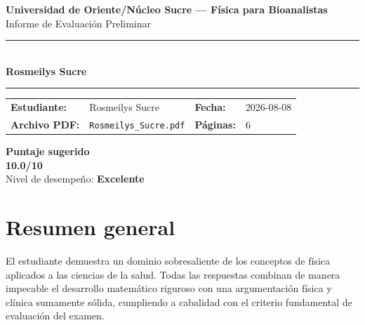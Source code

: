 \documentclass[11pt,a4paper]{article}
\begin{document}
\begin{center}
  {\Large\bfseries\color{azulTitulo} Universidad de Oriente/Núcleo Sucre --- Física para Bioanalistas}\\[4pt]
  {\large Informe de Evaluación Preliminar}\\[12pt]
  \rule{\linewidth}{1.2pt}\\[6pt]
  {\LARGE\bfseries Rosmeilys Sucre}\\[4pt]
  \rule{\linewidth}{0.6pt}
\end{center}

\vspace{4pt}
\begin{tcolorbox}[cajaTitulo, title=Datos del informe]
\begin{tabular}{@{}llll@{}}
  \textbf{Estudiante:}  & Rosmeilys Sucre  &
  \textbf{Fecha:}       & 2026-08-08 \\[4pt]
  \textbf{Archivo PDF:} & \texttt{Rosmeilys\_Sucre.pdf}  &
  \textbf{Páginas:}     & 6 \\
\end{tabular}
\end{tcolorbox}

\vspace{6pt}
\begin{center}
  \begin{tcolorbox}[
    enhanced,
    colback=white, colframe=desempeno_excelente,
    width=0.62\linewidth,
    boxrule=2pt,
    halign=center, valign=center,
    top=8pt, bottom=8pt,
  ]
    \centering
    {\large\bfseries Puntaje sugerido}\\[6pt]
    {\Huge\bfseries\color{desempeno_excelente} 10.0/10}\\[6pt]
    {\large Nivel de desempeño: \textbf{\color{desempeno_excelente} Excelente}}
  \end{tcolorbox}
\end{center}

\section*{Resumen general}
El estudiante demuestra un dominio sobresaliente de los conceptos de física aplicados a las ciencias de la salud. Todas las respuestas combinan de manera impecable el desarrollo matemático riguroso con una argumentación física y clínica sumamente sólida, cumpliendo a cabalidad con el criterio fundamental de evaluación del examen.
\end{document}
